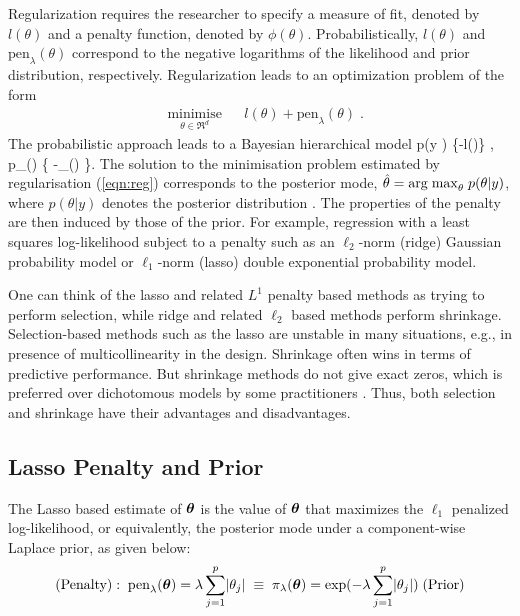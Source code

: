\documentclass[11pt]{article}
\begin{document}
Regularization requires the researcher to specify a measure of fit, denoted by $l(\theta)$ and a penalty function, denoted by $ \phi(\theta)$. Probabilistically,  $l(\theta)$ and $\text{pen}_{\lambda}(\theta)$ correspond to the negative logarithms of the likelihood and prior distribution, respectively.  Regularization leads to an optimization problem of the form 
\begin{equation}
\label{eqn:reg}
\begin{aligned}
& \underset{\theta \in \Re^d}{\text{minimise}}
& & l(\theta) + \text{pen}_{\lambda}(\theta) \; . 
\end{aligned}
\end{equation}
The probabilistic approach leads to a Bayesian hierarchical model
\beq
p(y \mid \theta) \propto \exp\{-l(\theta)\} \; , \quad p_{\lambda}(\theta) \propto \exp\{ -_{\lambda}(\theta) \}. \label{eq:pen}
\eeq
The solution to the minimisation problem estimated by regularisation (\ref{eqn:reg}) corresponds to the posterior mode, $ \hat{\theta} = {\rm arg \; max}_\theta \; p( \theta|y) $, where $ p(\theta|y)$ denotes the posterior distribution \citep{polson2015mixtures}. The properties of the penalty are then induced by those of the prior. For example, regression with a least squares log-likelihood subject to a penalty such as an $\ell_2$-norm (ridge) \citep{hoerl70} Gaussian probability model or $\ell_1$-norm (lasso) \citep{tibshirani96} double exponential probability model. 

One can think of the lasso and related $L^1$ penalty based methods as trying to perform selection, while ridge and related $\ell_2$ based methods perform shrinkage. Selection-based methods such as the lasso are unstable in many situations, e.g., in presence of multicollinearity in the design. Shrinkage often wins in terms of predictive performance. But shrinkage methods do not give exact zeros, which is preferred over dichotomous models by some practitioners \citep{stephens2009bayesian}. Thus, both selection and shrinkage have their advantages and disadvantages. 

\subsection{Lasso Penalty and Prior}\label{sec:lasso}

The Lasso based estimate of $\boldsymbol{\theta}$ is the value of $\boldsymbol{\theta}$ that maximizes the $\ell_1$ penalized log-likelihood, or equivalently, the posterior mode under a component-wise Laplace prior, as given below: 
\begin{equation}
(\text{Penalty}): \; \text{pen}_{\lambda}(\boldsymbol{\theta}) = \lambda \sum_{j = 1}^{p} \lvert\theta_j\rvert \; \equiv \; \pi_{\lambda}(\boldsymbol{\theta}) = \exp( - \lambda \sum_{j = 1}^{p} \lvert\theta_j\rvert) \; (\text{Prior})
\end{equation}
\end{document}
